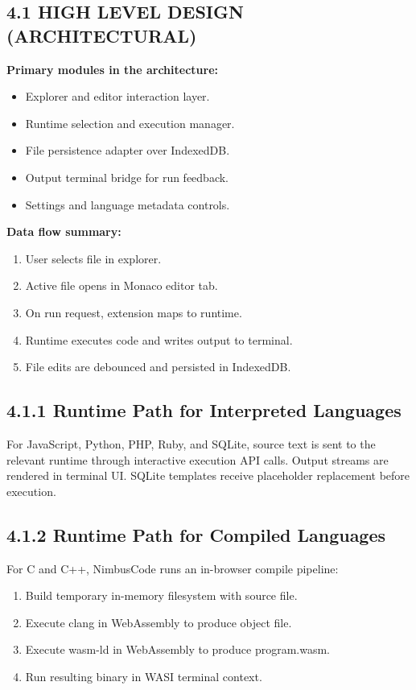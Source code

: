\subsection{4.1 HIGH LEVEL DESIGN (ARCHITECTURAL)}
\textbf{Primary modules in the architecture:}
\begin{itemize}[leftmargin=8mm]
\item Explorer and editor interaction layer.
\item Runtime selection and execution manager.
\item File persistence adapter over IndexedDB.
\item Output terminal bridge for run feedback.
\item Settings and language metadata controls.
\end{itemize}

\textbf{Data flow summary:}
\begin{enumerate}[leftmargin=8mm]
\item User selects file in explorer.
\item Active file opens in Monaco editor tab.
\item On run request, extension maps to runtime.
\item Runtime executes code and writes output to terminal.
\item File edits are debounced and persisted in IndexedDB.
\end{enumerate}

\subsection*{4.1.1 Runtime Path for Interpreted Languages}
For JavaScript, Python, PHP, Ruby, and SQLite, source text is sent to the relevant runtime through interactive execution API calls. Output streams are rendered in terminal UI. SQLite templates receive placeholder replacement before execution.

\subsection*{4.1.2 Runtime Path for Compiled Languages}
For C and C++, NimbusCode runs an in-browser compile pipeline:
\begin{enumerate}[leftmargin=8mm]
\item Build temporary in-memory filesystem with source file.
\item Execute clang in WebAssembly to produce object file.
\item Execute wasm-ld in WebAssembly to produce program.wasm.
\item Run resulting binary in WASI terminal context.
\end{enumerate}

